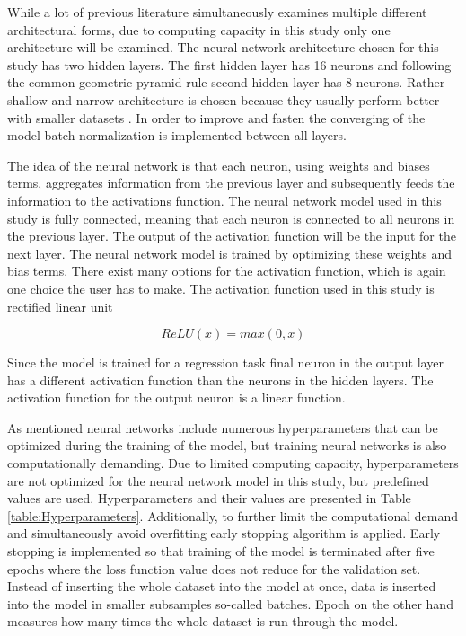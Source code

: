 \documentclass[12pt]{article}
\begin{document}
While a lot of previous literature simultaneously examines multiple different architectural forms, due to computing capacity in this study only one architecture will be examined.\footnotemark {} The neural network architecture chosen for this study has two hidden layers. The first hidden layer has 16 neurons and following the common geometric pyramid rule second hidden layer has 8 neurons. Rather shallow and narrow architecture is chosen because they usually perform better with smaller datasets \citep{guetal}.\footnotemark {} In order to improve and fasten the converging of the model batch normalization is implemented between all layers. \par

The idea of the neural network is that each neuron, using weights and biases terms, aggregates information from the previous layer and subsequently feeds the information to the activations function. The neural network model used in this study is fully connected, meaning that each neuron is connected to all neurons in the previous layer. The output of the activation function will be the input for the next layer. The neural network model is trained by optimizing these weights and bias terms. There exist many options for the activation function, which is again one choice the user has to make. The activation function used in this study is rectified linear unit \par

\begin{equation}
\label{ReLU}
ReLU(x) = max(0, x)
\end{equation}

Since the model is trained for a regression task final neuron in the output layer has a different activation function than the neurons in the hidden layers. The activation function for the output neuron is a linear function. \par

As mentioned neural networks include numerous hyperparameters that can be optimized during the training of the model, but training neural networks is also computationally demanding. Due to limited computing capacity, hyperparameters are not optimized for the neural network model in this study, but predefined values are used. Hyperparameters and their values are presented in Table \ref{table:Hyperparameters}. Additionally, to further limit the computational demand and simultaneously avoid overfitting early stopping algorithm is applied. Early stopping is implemented so that training of the model is terminated after five epochs where the loss function value does not reduce for the validation set. Instead of inserting the whole dataset into the model at once, data is inserted into the model in smaller subsamples so-called batches. Epoch on the other hand measures how many times the whole dataset is run through the model. \par
\end{document}
